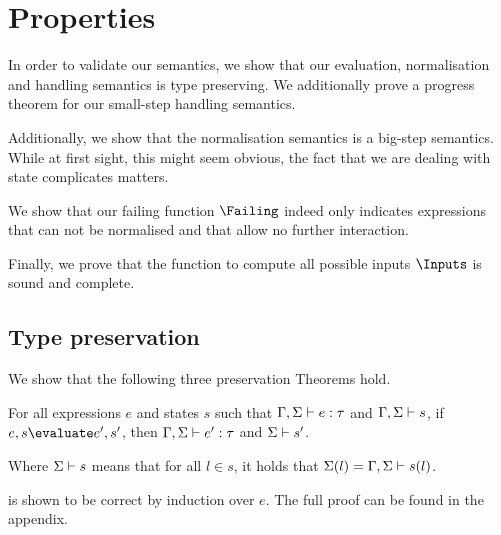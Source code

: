 


\section{Properties}
\label{sec:properties}




In order to validate our semantics, we show that our evaluation, normalisation
and handling semantics is type preserving. We additionally prove a progress
theorem for our small-step handling semantics.

Additionally, we show that the normalisation semantics is a big-step semantics.
While at first sight, this might seem obvious, the fact that we are dealing with
state complicates matters.

We show that our failing function $\Failing$ indeed only indicates expressions
that can not be normalised and that allow no further interaction.

Finally, we prove that the function to compute all possible inputs $\Inputs$ is sound and complete.



\subsection{Type preservation}
\label{sub:preservation}

We show that the following three preservation Theorems hold.

\begin{theorem}
  For all expressions $e$ and states $s$
  such that $\Gamma,\Sigma \vdash e:\tau$ and $\Gamma,\Sigma \vdash s$,
  if $e,s \evaluate e',s'$,
  then $\Gamma,\Sigma \vdash e':\tau$ and $\Sigma \vdash s'$.
  \label{thm:pres-eval}
\end{theorem}

Where $\Sigma \vdash s$ means that for all $l\in s$, it holds that
$\Sigma(l)=\Gamma,\Sigma\vdash s(l)$.

 is shown to be correct by induction over $e$. The full
proof can be found in the appendix.


